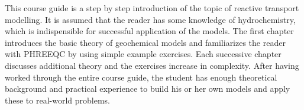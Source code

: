 This course guide is a step by step introduction of the topic of reactive transport modelling. It is assumed that the reader has some knowledge of hydrochemistry, which is indispensible for successful application of the models. The first chapter introduces the basic theory of geochemical models and familiarizes the reader with PHREEQC by using simple example exercises. Each successive chapter discusses additional theory and the exercises increase in complexity. After having worked through the entire course guide, the student has enough theoretical background and practical experience to build his or her own models and apply these to real-world problems.

